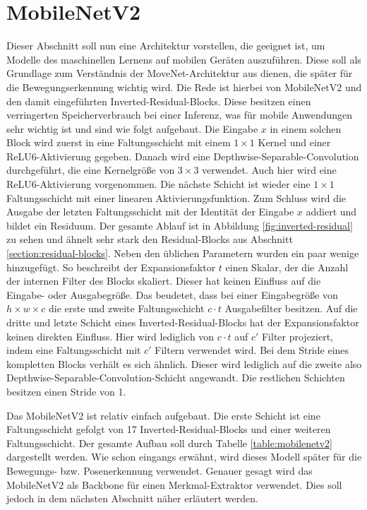 \section{MobileNetV2}
Dieser Abschnitt soll nun eine Architektur vorstellen, die geeignet ist, um
Modelle des maschinellen Lernens auf mobilen Geräten auszuführen. Diese soll
als Grundlage zum Verständnis der MoveNet-Architektur aus \cite{movenet}
dienen, die später für die Bewegungserkennung wichtig wird. Die Rede ist
hierbei von MobileNetV2 \cite{sandler2019mobilenetv2} und den damit
eingeführten Inverted-Residual-Blocks. Diese besitzen einen verringerten
Speicherverbrauch bei einer Inferenz, was für mobile Anwendungen sehr wichtig
ist und sind wie folgt aufgebaut. Die Eingabe $x$ in einem solchen Block wird
zuerst in eine Faltungsschicht mit einem $1 \times 1$ Kernel und einer
ReLU6-Aktivierung gegeben. Danach wird eine Depthwise-Separable-Convolution
\cite{howard2017mobilenets} durchgeführt, die eine Kernelgröße von $3 \times 3$
verwendet. Auch hier wird eine ReLU6-Aktivierung vorgenommen. Die nächste
Schicht ist wieder eine $1 \times 1$ Faltungsschicht mit einer linearen
Aktivierungsfunktion. Zum Schluss wird die Ausgabe der letzten Faltungsschicht
mit der Identität der Eingabe $x$ addiert und bildet ein Residuum. Der gesamte
Ablauf ist in Abbildung \ref{fig:inverted-residual} zu sehen und ähnelt sehr
stark den Residual-Blocks aus Abschnitt \ref{section:residual-blocks}. Neben
den üblichen Parametern wurden ein paar wenige hinzugefügt. So beschreibt der
Expansionsfaktor $t$ einen Skalar, der die Anzahl der internen Filter des
Blocks skaliert. Dieser hat keinen Einfluss auf die Eingabe- oder Ausgabegröße.
Das beudetet, dass bei einer Eingabegröße von $h \times w \times c$ die erste
und zweite Faltungsschicht $c \cdot t$ Ausgabefilter besitzen. Auf die dritte
und letzte Schicht eines Inverted-Residual-Blocks hat der Expansionsfaktor
keinen direkten Einfluss. Hier wird lediglich von $c \cdot t$ auf $c'$ Filter
projeziert, indem eine Faltungsschicht mit $c'$ Filtern verwendet wird. Bei dem Stride eines kompletten Blocks verhält es sich ähnlich.
Dieser wird lediglich auf die zweite also
Depthwise-Separable-Convolution-Schicht angewandt. Die restlichen Schichten
besitzen einen Stride von 1.

Das MobileNetV2 ist relativ einfach aufgebaut. Die erste Schicht
ist eine Faltungsschicht gefolgt von 17 Inverted-Residual-Blocks
und einer weiteren Faltungsschicht. Der gesamte Aufbau soll
durch Tabelle \ref{table:mobilenetv2} dargestellt werden. Wie schon eingangs
erwähnt, wird dieses Modell später für die Bewegungs- bzw. Posenerkennung
verwendet. Genauer gesagt wird das MobileNetV2 als Backbone für einen
Merkmal-Extraktor verwendet. Dies soll jedoch in dem nächsten Abschnitt näher
erläutert werden.

